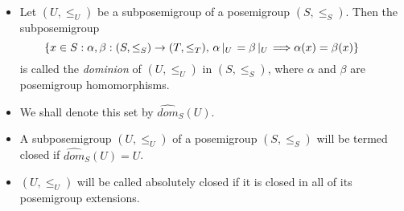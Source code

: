\documentclass[notes=show]{beamer}
\newenvironment{stepitemize}{\begin{itemize}[<+->]}{\end{itemize} }
\begin{document}
\begin{frame}%


\begin{stepitemize}
\item Let $(U,\leq _{U})$ be a subposemigroup of a posemigroup $(S,\leq
_{S}) $. Then the subposemigroup%
\begin{equation*}
\{x\in S:\alpha ,\beta :(S,{\small \leq }_{S})\rightarrow (T,{\small \leq }%
_{T})\text{, }\alpha \left\vert _{U}\right. =\beta \left\vert _{U}\right.
\Longrightarrow \alpha (x)=\beta (x)\}\text{ \ \ \ \ \ }
\end{equation*}%
is called the \textit{dominion} of $(U,\leq _{U})$ in $(S,\leq _{S})$, where 
$\alpha $ and $\beta $ are posemigroup homomorphisms.\bigskip

\item We shall denote this set by $\widehat{dom}_{S}(U)$.
\end{stepitemize}

\transboxout%
\end{frame}%

\begin{frame}%


\begin{stepitemize}
\item A subposemigroup $(U,\leq _{U})$ of a posemigroup $(S,\leq _{S})$ will
be termed closed if $\widehat{dom}_{S}(U)=U$.\bigskip

\item $(U,\leq _{U})$ will be called absolutely closed if it is closed in
all of its posemigroup extensions.
\end{stepitemize}

\begin{equation*}
\end{equation*}

\transboxout%
\end{frame}%
\end{document}
